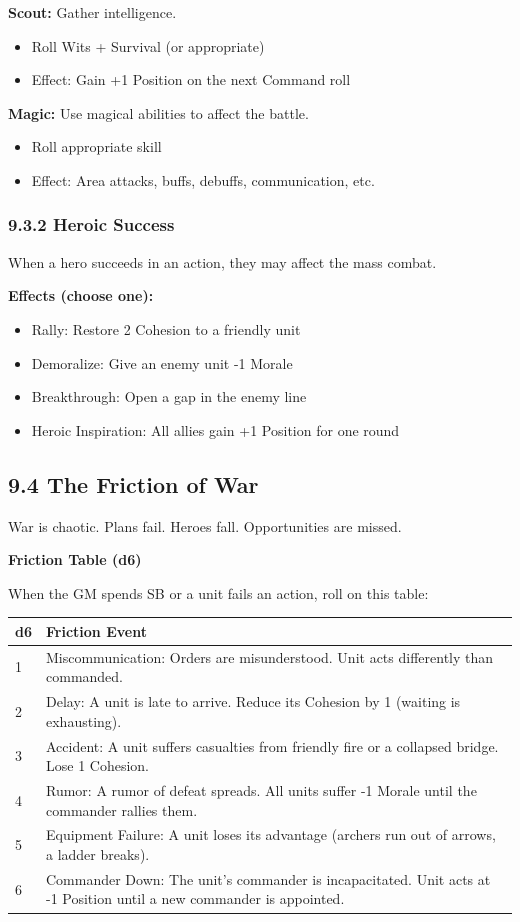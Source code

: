 \documentclass[11pt]{article}
\begin{document}
\textbf{Scout:} Gather intelligence.
\begin{itemize}
  \item Roll Wits + Survival (or appropriate)
  \item Effect: Gain +1 Position on the next Command roll
\end{itemize}

\textbf{Magic:} Use magical abilities to affect the battle.
\begin{itemize}
  \item Roll appropriate skill
  \item Effect: Area attacks, buffs, debuffs, communication, etc.
\end{itemize}

\subsubsection{9.3.2 Heroic Success}

When a hero succeeds in an action, they may affect the mass combat.

\textbf{Effects (choose one):}
\begin{itemize}
  \item Rally: Restore 2 Cohesion to a friendly unit
  \item Demoralize: Give an enemy unit -1 Morale
  \item Breakthrough: Open a gap in the enemy line
  \item Heroic Inspiration: All allies gain +1 Position for one round
\end{itemize}

\subsection{9.4 The Friction of War}

War is chaotic. Plans fail. Heroes fall. Opportunities are missed.

\textbf{Friction Table (d6)}

When the GM spends SB or a unit fails an action, roll on this table:

\begin{tabular}{|l|l|}
\hline
d6 & Friction Event \\
\hline
1 & Miscommunication: Orders are misunderstood. Unit acts differently than commanded. \\
\hline
2 & Delay: A unit is late to arrive. Reduce its Cohesion by 1 (waiting is exhausting). \\
\hline
3 & Accident: A unit suffers casualties from friendly fire or a collapsed bridge. Lose 1 Cohesion. \\
\hline
4 & Rumor: A rumor of defeat spreads. All units suffer -1 Morale until the commander rallies them. \\
\hline
5 & Equipment Failure: A unit loses its advantage (archers run out of arrows, a ladder breaks). \\
\hline
6 & Commander Down: The unit's commander is incapacitated. Unit acts at -1 Position until a new commander is appointed. \\
\hline
\end{tabular}
\end{document}

